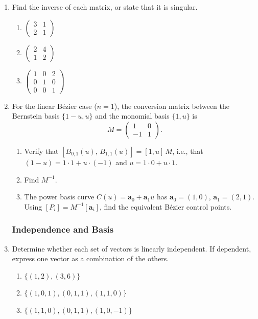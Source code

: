 \begin{enumerate}
\item Find the inverse of each matrix, or state that it is singular.
\begin{enumerate}
  \item $\begin{pmatrix} 3 & 1 \\ 2 & 1 \end{pmatrix}$

  \item $\begin{pmatrix} 2 & 4 \\ 1 & 2 \end{pmatrix}$

  \item $\begin{pmatrix} 1 & 0 & 2 \\ 0 & 1 & 0 \\ 0 & 0 & 1 \end{pmatrix}$
\end{enumerate}

\item For the linear Bézier case ($n=1$), the conversion matrix between the
Bernstein basis $\{1-u, u\}$ and the monomial basis $\{1, u\}$ is
\[
  M = \begin{pmatrix} 1 & 0 \\ -1 & 1 \end{pmatrix}.
\]
\begin{enumerate}
  \item Verify that $[B_{0,1}(u),\, B_{1,1}(u)] = [1, u]\, M$, i.e., that
        $(1-u) = 1 \cdot 1 + u \cdot (-1)$ and $u = 1 \cdot 0 + u \cdot 1$.
  \item Find $M^{-1}$.
  \item The power basis curve $C(u) = \mathbf{a}_0 + \mathbf{a}_1 u$ has $\mathbf{a}_0 = (1,0)$,
        $\mathbf{a}_1 = (2,1)$.
        Using $[P_i] = M^{-1}[\mathbf{a}_i]$, find the equivalent Bézier control points.
\end{enumerate}

\subsubsection*{Independence and Basis}

\item Determine whether each set of vectors is linearly independent.
If dependent, express one vector as a combination of the others.
\begin{enumerate}
  \item $\{(1, 2), (3, 6)\}$
  \item $\{(1,0,1), (0,1,1), (1,1,0)\}$
  \item $\{(1,1,0), (0,1,1), (1,0,-1)\}$
\end{enumerate}


\end{enumerate}
